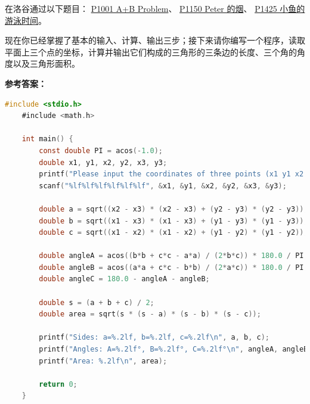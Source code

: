 \documentclass[lang=cn,newtx,10pt,scheme=chinese]{elegantbook}
\begin{document}
\begin{problemset}[练习]
    \item 在洛谷通过以下题目：
        \href{https://www.luogu.com.cn/problem/P1001}{P1001 A+B Problem}、
        \href{https://www.luogu.com.cn/problem/P1150}{P1150 Peter 的烟}、
        \href{https://www.luogu.com.cn/problem/P1425}{P1425 小鱼的游泳时间}。
    \item 现在你已经掌握了基本的输入、计算、输出三步；接下来请你编写一个程序，读取平面上三个点的坐标，计算并输出它们构成的三角形的三条边的长度、三个角的角度以及三角形面积。
\end{problemset}

\newpage

\textbf{参考答案：}

\begin{lstlisting}[language=C]
    #include <stdio.h>
    #include <math.h>

    int main() {
        const double PI = acos(-1.0);
        double x1, y1, x2, y2, x3, y3;
        printf("Please input the coordinates of three points (x1 y1 x2 y2 x3 y3):");
        scanf("%lf%lf%lf%lf%lf%lf", &x1, &y1, &x2, &y2, &x3, &y3);

        double a = sqrt((x2 - x3) * (x2 - x3) + (y2 - y3) * (y2 - y3));
        double b = sqrt((x1 - x3) * (x1 - x3) + (y1 - y3) * (y1 - y3));
        double c = sqrt((x1 - x2) * (x1 - x2) + (y1 - y2) * (y1 - y2));

        double angleA = acos((b*b + c*c - a*a) / (2*b*c)) * 180.0 / PI;
        double angleB = acos((a*a + c*c - b*b) / (2*a*c)) * 180.0 / PI;
        double angleC = 180.0 - angleA - angleB;

        double s = (a + b + c) / 2;
        double area = sqrt(s * (s - a) * (s - b) * (s - c));

        printf("Sides: a=%.2lf, b=%.2lf, c=%.2lf\n", a, b, c);
        printf("Angles: A=%.2lf°, B=%.2lf°, C=%.2lf°\n", angleA, angleB, angleC);
        printf("Area: %.2lf\n", area);

        return 0;
    }
\end{lstlisting}
\end{document}
